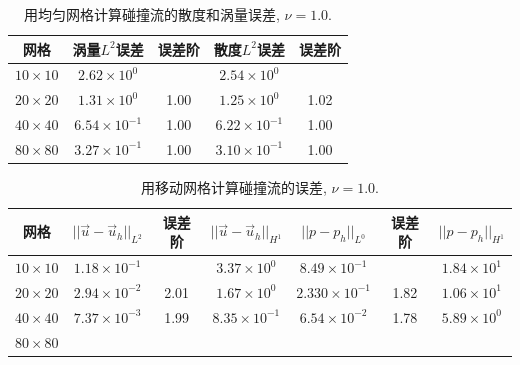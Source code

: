 \documentclass{report}
\theoremstyle{Remark}
\begin{document}
          \begin{table}[!htbp]
            \centering
            \begin{tabular}{ccccc} \toprule
              网格   & 涡量$L^2$误差 & 误差阶 & 散度$L^2$误差 & 误差阶\\ \midrule
              $10 \times 10$    &   $2.62 \times 10^{0}$   &  &   $2.54 \times
              10^0$ &  \\
              $20 \times 20 $   &   $1.31 \times 10^{0}$  & 1.00  &   $1.25 \times
              10^0$ & 1.02 \\
              $40 \times 40 $   &   $6.54 \times 10^{-1}$ & 1.00  &   $6.22 \times
              10^{-1}$ &  1.00 \\
              $80 \times 80 $   &   $3.27 \times 10^{-1}$ & 1.00  &   $3.10 \times
              10^{-1}$ & 1.00 \\ \bottomrule
            \end{tabular}
            \caption{\small 用均匀网格计算碰撞流的散度和涡量误差, $\nu = 1.0$.}
            \label{tab::colliding_uniform_div_error}
          \end{table}

          \begin{table}[!htbp]
            \centering
            \begin{tabular}{ccccccc} \toprule
              网格   & $||\vec{u} - \vec{u}_h ||_{L^2}$ & 误差阶 &$||\vec{u} -
              \vec{u}_h ||_{H^1}$ & $||p - p_h||_{L^0}$ & 误差阶 &$||p -
              p_h||_{H^1}$  \\ \midrule
              $10 \times 10$   &   $1.18 \times 10^{-1}$   &  &  $3.37 \times
              10^0$     &   $8.49 \times 10^{-1}$ & & $1.84 \times 10^1$    \\  
              $20 \times 20 $   &   $2.94 \times 10^{-2}$   & 2.01  &  $1.67 \times
              10^0$     &   $2.330 \times 10^{-1}$ & 1.82 & $1.06 \times 10^1$   \\
              $40 \times 40 $   &   $7.37 \times 10^{-3}$   & 1.99  & $8.35 \times
              10^{-1}$  &   $6.54 \times 10^{-2}$ & 1.78 & $5.89 \times 10^0$   \\
              $80 \times 80 $   &   &  &  & &  &  \\ \bottomrule
            \end{tabular}
            \caption{\small 用移动网格计算碰撞流的误差, $\nu = 1.0$.}
            \label{tab::colliding_moving_error}
          \end{table}
\end{document}
